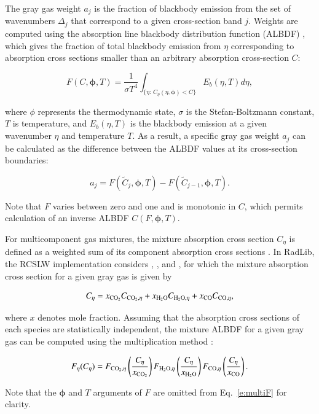 \documentclass[preprint,12pt]{elsarticle}
\newcommand{\BS}{\boldsymbol}
\newcounter{bla}
\begin{document}
The gray gas weight $a_j$ is the fraction of blackbody emission from the set of wavenumbers $\Delta_j$ that correspond to a given cross-section band $j$. Weights are computed using the absorption line blackbody distribution function (ALBDF) \cite{Pearson_2014}, which gives the fraction of total blackbody emission from $\eta$ corresponding to absorption cross sections smaller than an arbitrary absorption cross-section $C$:
%
\begin{linenomath}
\begin{equation} \label{e:albdf}
F(C,\BS{\phi},T) = \frac{1}{\sigma T^4}\int_{\{\eta:\,C_\eta(\eta,\BS{\phi})<C\}}E_b(\eta,T)d\eta,
\end{equation}
\end{linenomath}
%
where $\phi$ represents the thermodynamic state, $\sigma$ is the Stefan-Boltzmann constant, $T$ is temperature, and $E_b(\eta,T)$ is the blackbody emission at a given wavenumber $\eta$ and temperature $T$.
As a result, a specific gray gas weight $a_j$ can be calculated as the difference between the ALBDF values at its cross-section boundaries:
%
\begin{linenomath}
\begin{equation} \label{e:aj}
a_j = F(\tilde{C}_j,\BS{\phi}, T) - F(\tilde{C}_{j-1}, \BS{\phi},T).
\end{equation}
\end{linenomath}
%
Note that $F$ varies between zero and one and is monotonic in $C$, which permits calculation of an inverse ALBDF $C(F,\BS{\phi},T)$.

For multicomponent gas mixtures, the mixture absorption cross section $C_{\eta}$ is defined as a weighted sum of its component absorption cross sections \cite{Solovjov_2000}.
In RadLib, the RCSLW implementation considers , , and , for which the mixture absorption cross section for a given gray gas is given by
%
\begin{linenomath}
\begin{equation} \label{e:multiC}
C_{\eta} = x_{\ce{CO2}}C_{\ce{CO2},\eta} + x_{\ce{H2O}}C_{\ce{H2O},\eta} + x_{\ce{CO}}C_{\ce{CO},\eta},
\end{equation}
\end{linenomath}
%
where $x$ denotes mole fraction.
Assuming that the absorption cross sections of each species are statistically independent, the mixture ALBDF for a given gray gas can be computed using the multiplication method \cite{Solovjov_2000}:
%
\begin{linenomath}
\begin{equation} \label{e:multiF}
F_{\eta}(C_{\eta}) = F_{\ce{CO2},\eta} \left( \frac{C_{\eta}}{x_{\ce{CO2}}} \right) F_{\ce{H2O},\eta} \left( \frac{C_{\eta}}{x_{\ce{H2O}}} \right) F_{\ce{CO},\eta} \left( \frac{C_{\eta}}{x_{\ce{CO}}} \right).
\end{equation}
\end{linenomath}
%
Note that the $\BS{\phi}$ and $T$ arguments of $F$ are omitted from Eq.~\ref{e:multiF} for clarity.
\end{document}
